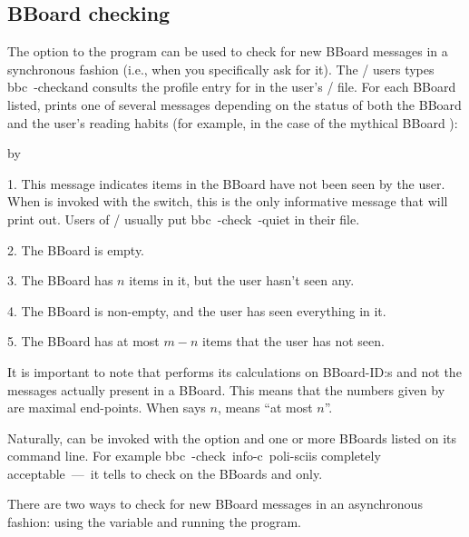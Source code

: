 \subsection{BBoard checking}
The  option to the  program can be used to check for
new BBoard messages in a synchronous fashion
(i.e., when you specifically ask for it).
The \MH/ users types \example bbc\ -check\endexample and  consults
the profile entry for  in the user's \profile/ file.
For each BBoard listed,
 prints one of several messages depending on the status of both the
BBoard and the user's reading habits
(for example, in the case of the mythical BBoard ):
\smallskip
{\advance\leftskip by\parindent
\item{1.} \hbreak
This message indicates items in the BBoard have not been seen by the user.
When  is invoked with the  switch,
this is the only informative message that  will print out.
Users of \MH/ usually put \example bbc\ -check\ -quiet\endexample
in their  file.

\item{2.} \hbreak
The BBoard is empty.

\item{3.} \hbreak
The BBoard has $n$ items in it, but the user hasn't seen any.

\item{4.} \hbreak
The BBoard is non-empty, and the user has seen everything in it.

\item{5.} \hbreak
The BBoard has at most $m-n$ items that the user has not seen.
\medskip}
\noindent
It is important to note that  performs its calculations on
BBoard-ID:s and not the messages actually present in a BBoard.
This means that the numbers given by  are maximal end-points.
When  says $n$,  means ``at most $n$''.

Naturally,  can be invoked with the  option and one or
more BBoards listed on its command line.
For example \example bbc\ -check\ info-c\ poli-sci\endexample is completely
acceptable~---~it tells  to check on the BBoards  and
 only.

There are two ways to check for new BBoard messages in an asynchronous fashion:
using the  variable  and running the 
program.

